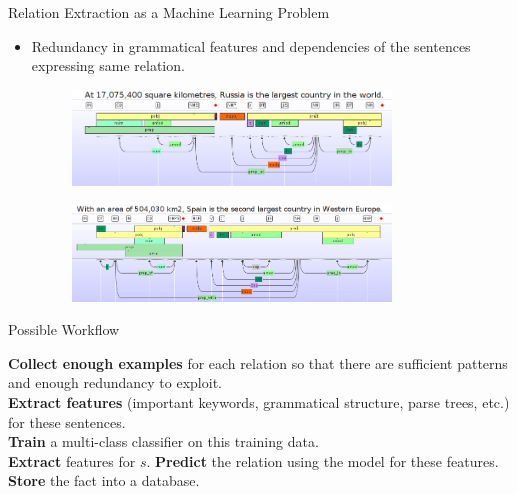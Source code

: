 \documentclass{beamer}
\begin{document}
\begin{frame}{Relation Extraction as a Machine Learning Problem}
 
 \begin{itemize}
  \item Redundancy in grammatical features and dependencies of the sentences expressing same relation. \pause 
     \begin{figure}
    \centering
    \includegraphics[width = 0.8\textwidth]{images/ex_4}
  \end{figure} \pause
  
   \begin{figure}
    \centering
    \includegraphics[width = 0.8\textwidth]{images/ex_5}
  \end{figure}
 \end{itemize}

\end{frame}



\begin{frame}{Possible Workflow} \pause
\begin{algorithm}[H]
\begin{algorithmic}[1]
\STATE \textbf{Collect enough examples} for each relation so that there are sufficient patterns and enough redundancy to exploit. \\ \pause
\STATE \textbf{Extract features} (important keywords, grammatical structure, parse trees, etc.) for these sentences. \\ \pause
\STATE \textbf{Train} a multi-class classifier on this training data. \\ \pause
{} \pause
\STATE \textbf{Extract} features for $s$. \pause
\STATE \textbf{Predict} the relation using the model for these features. \pause
\STATE \textbf{Store} the fact into a database.
\ENDFOR

\end{algorithmic}
\caption*{Relation Extraction}
\label{alg:seq}
\end{algorithm}
\end{frame}
\end{document}
